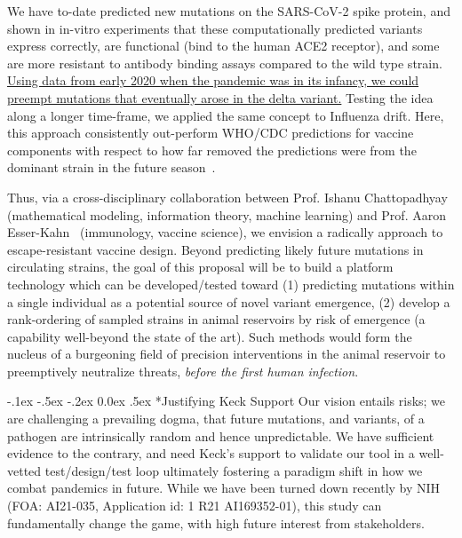 \documentclass[onecolumn, compsoc,12pt]{IEEEtran}
\makeatletter
\renewcommand\paragraph{\@startsection {section}{1}{\z@}%
                                   {-.1ex \@plus -.5ex \@minus -.2ex}%
                                   {0.0ex \@plus.5ex}%
                                   {\fontsize{11}{10}\selectfont\bfseries\itshape\sffamily\color{black}}}
\def\hcov{SARS-CoV-2\xspace}
\makeatother
\begin{document}
We have to-date predicted new mutations on the \hcov spike protein, and shown in in-vitro experiments that these computationally predicted variants express correctly, are functional (bind to the human ACE2 receptor), and some are more resistant to antibody binding assays compared to the wild type strain. \uline{Using data from early 2020 when the pandemic was in its infancy, we could preempt mutations that eventually arose in the delta variant.} Testing the idea along a longer time-frame, we applied the same concept to Influenza drift. Here, this approach consistently out-perform WHO/CDC predictions for vaccine components with respect to how far removed the predictions were  from the dominant strain in the future season~\cite{Li2020.07.17.20156364}.

Thus, via a cross-disciplinary collaboration  between Prof. Ishanu Chattopadhyay~\cite{chattopadhyay2014data,chattopadhyay2018conjunction,huang2021universal,onishchenko2021reduced} (mathematical modeling, information theory, machine learning) and Prof. Aaron Esser-Kahn~\cite{onishchenko2021reduced,moser2019small,manna2020pathogen} (immunology, vaccine science), we envision a radically  approach to escape-resistant vaccine design. Beyond  predicting likely future mutations in circulating strains, the goal of this proposal will be to build a platform technology which can be developed/tested toward (1) predicting mutations within a single individual as a potential source of novel variant emergence, (2) develop a rank-ordering of  sampled strains in animal reservoirs by  risk of emergence (a capability well-beyond the state of the art). Such methods would form the nucleus of a burgeoning field of precision  interventions  in the animal reservoir to preemptively neutralize threats,  \textit{before the first human infection}.

\paragraph*{Justifying Keck Support} Our vision   entails  risks;  we are challenging a prevailing dogma, that future mutations, and variants, of a pathogen are intrinsically random and hence unpredictable.  We have sufficient evidence to the contrary, and need Keck's support to validate our tool in a well-vetted test/design/test loop  ultimately fostering a paradigm shift in  how we combat pandemics in future. While we have been turned down recently by NIH (FOA: AI21-035, Application id: 1 R21 AI169352-01), this study can fundamentally change the game, with high future interest from stakeholders.
\end{document}
